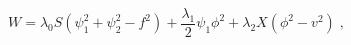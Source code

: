 \begin{equation}
W= \lambda_0 S (\psi_1^2 +\psi_2^2 -f^2) + \frac{\lambda_1}{2} \psi_1
 \phi^2 + \lambda_2 X(\phi^2-v^2) \;,
\end{equation}


